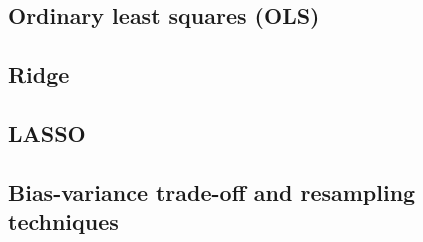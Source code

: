 \thispagestyle{plain}
\subsection{Ordinary least squares (OLS)}
\subsection{Ridge}
\subsection{LASSO}
\subsection{Bias-variance trade-off and resampling techniques}
